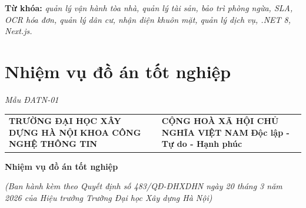 \textbf{Từ khóa: }\textit{quản lý vận hành tòa nhà, quản lý tài sản, bảo trì phòng ngừa, SLA, OCR hóa đơn, quản lý dân cư, nhận diện khuôn mặt, quản lý dịch vụ, .NET 8, Next.js.}

\chapter*{Nhiệm vụ đồ án tốt nghiệp}
\textit{Mẫu ĐATN-01}

\begin{center}{\singlespacing\renewcommand{\arraystretch}{1.2}
\begin{tabular}{>{\raggedright\arraybackslash}p{}>{\centering\arraybackslash}p{}}
\textbf{TRƯỜNG ĐẠI HỌC XÂY DỰNG HÀ NỘI} \newline \textbf{KHOA CÔNG NGHỆ THÔNG TIN} & \textbf{CỘNG HOÀ XÃ HỘI CHỦ NGHĨA VIỆT NAM} \newline \textbf{Độc lập - Tự do - Hạnh phúc} \\
\end{tabular}}\end{center}
\textbf{Nhiệm vụ đồ án tốt nghiệp}

\textit{(Ban hành kèm theo Quyết định số 483/QĐ-ĐHXDHN ngày 20 tháng 3 năm 2026 của Hiệu trưởng Trường Đại học Xây dựng Hà Nội)}

